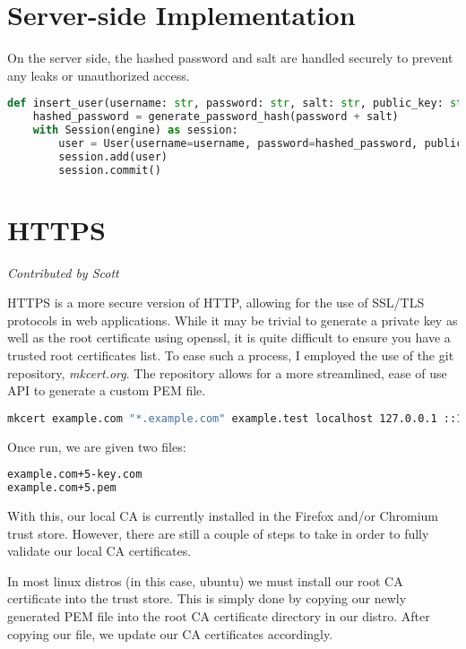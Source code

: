 \documentclass{article}
\begin{document}
\section*{Server-side Implementation}
On the server side, the hashed password and salt are handled securely to prevent any leaks or unauthorized access.

\begin{lstlisting}[language=Python]
def insert_user(username: str, password: str, salt: str, public_key: str):
    hashed_password = generate_password_hash(password + salt)
    with Session(engine) as session:
        user = User(username=username, password=hashed_password, public_key=public_key)
        session.add(user)
        session.commit()
\end{lstlisting}

\section{HTTPS}
\textit{Contributed by Scott}

HTTPS is a more secure version of HTTP, allowing for the use of SSL/TLS protocols in web applications. While it may be trivial to generate a private key as well as the root certificate using openssl, it is quite difficult to ensure you have a trusted root certificates list. To ease such a process, I employed the use of the git repository, \textit{mkcert.org}. The repository allows for a more streamlined, ease of use API to generate a custom PEM file. 

\begin{lstlisting}[language=bash]
mkcert example.com "*.example.com" example.test localhost 127.0.0.1 ::1
\end{lstlisting}

Once run, we are given two files:

\begin{lstlisting}[language=bash]
example.com+5-key.com
example.com+5.pem
\end{lstlisting}

With this, our local CA is currently installed in the Firefox and/or Chromium trust store. However, there are still a couple of steps to take in order to fully validate our local CA certificates.

In most linux distros (in this case, ubuntu) we must install our root CA certificate into the trust store. This is simply done by copying our newly generated PEM file into the root CA certificate directory in our distro. After copying our file, we update our CA certificates accordingly.
\end{document}

